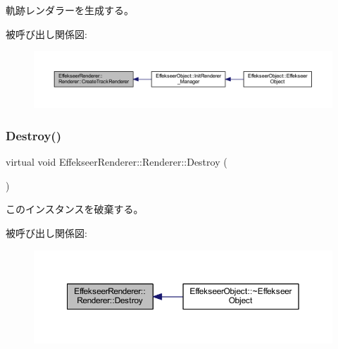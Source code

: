 軌跡レンダラーを生成する。 

被呼び出し関係図\+:\nopagebreak
\begin{figure}[H]
\begin{center}
\leavevmode
\includegraphics[width=350pt]{class_effekseer_renderer_1_1_renderer_a38cff31386fce6fe0122a4ac5804fd8f_icgraph}
\end{center}
\end{figure}
\mbox{\label{class_effekseer_renderer_1_1_renderer_a8da94391eb26a2bd04830e4d7fcd0bd0}} 
\subsubsection{\texorpdfstring{Destroy()}{Destroy()}}
{\footnotesize\ttfamily virtual void Effekseer\+Renderer\+::\+Renderer\+::\+Destroy (\begin{DoxyParamCaption}{ }\end{DoxyParamCaption})\hspace{0.3cm}{\ttfamily [pure virtual]}}



このインスタンスを破棄する。 

被呼び出し関係図\+:\nopagebreak
\begin{figure}[H]
\begin{center}
\leavevmode
\includegraphics[width=350pt]{class_effekseer_renderer_1_1_renderer_a8da94391eb26a2bd04830e4d7fcd0bd0_icgraph}
\end{center}
\end{figure}
\mbox{\label{class_effekseer_renderer_1_1_renderer_aaa6df6f62aead71652bdeb596d0a7ef4}} 
